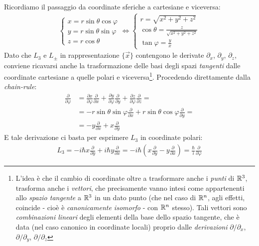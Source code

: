 \documentclass[../../FisicaTeorica.tex]{subfiles}
\begin{document}
Ricordiamo il passaggio da coordinate sferiche a cartesiane e viceversa:
\begin{align*}
\begin{cases}
x = r\sin\theta \cos \varphi\\
y = r\sin\theta \sin\varphi\\
z = r\cos\theta
\end{cases} \Leftrightarrow 
\begin{cases}
r = \sqrt{x^2 + y^2 +z^2}\\
\cos\theta = \displaystyle\frac{z}{\sqrt{x^2 + y^2 + z^2}}\\
\tan\varphi = \displaystyle \frac{y}{x}
\end{cases}
\end{align*}
Dato che $L_3$ e $L_\pm$ in rappresentazione $\{\vec{x}\}$ contengono le derivate $\partial_x$, $\partial_y$, $\partial_z$, conviene ricavarsi anche la trasformazione delle basi degli spazi \textit{tangenti} dalle coordinate cartesiane a quelle polari e viceversa\footnote{L'idea è che il cambio di coordinate oltre a trasformare anche i \textit{punti} di $\mathbb{R}^3$, trasforma anche i \textit{vettori}, che precisamente vanno intesi come appartenenti allo \textit{spazio tangente} a $\mathbb{R}^3$ in un dato punto (che nel caso di $\mathbb{R}^n$, agli effetti, coincide - cioè è \textit{canonicamente isomorfo} - con $\mathbb{R}^n$ stesso). Tali vettori sono \textit{combinazioni lineari} degli elementi della base dello spazio tangente, che è data (nel caso canonico in coordinate locali) proprio dalle \textit{derivazioni} $\partial/\partial_x$, $\partial/\partial_y$, $\partial/\partial_z$}. Procedendo direttamente dalla \textit{chain-rule}:
\begin{align}
\label{eqn:partial-phi}
\frac{\partial}{\partial \varphi} &=\frac{\partial x}{\partial \varphi}\frac{\partial}{\partial x} + \frac{\partial y}{\partial \varphi}\frac{\partial}{\partial y} + \frac{\partial z}{\partial \varphi}\frac{\partial}{\partial z} =\\ \nonumber
&= -r\sin\theta\sin\varphi\frac{\partial}{\partial x} + r\sin\theta \cos\varphi \frac{\partial}{\partial y} =\\ \nonumber
&= -y\frac{\partial}{\partial x} + x\frac{\partial}{\partial y}
\end{align}
E tale derivazione ci basta per esprimere $L_3$ in coordinate polari:
\begin{align*}
L_3 = -i\hbar x \frac{\partial}{\partial y}+ i\hbar y \frac{\partial}{\partial x} = -i\hbar \left(
x\frac{\partial}{\partial y} -y\frac{\partial}{\partial x}
\right) = \frac{\hbar}{i}\frac{\partial}{\partial \varphi}
\end{align*}
\end{document}

